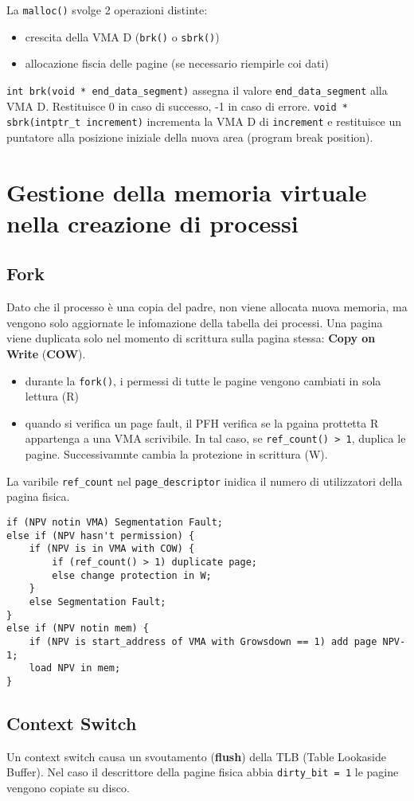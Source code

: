\documentclass[12pt, a4paper]{report}
\begin{document}
La \texttt{malloc()} svolge 2 operazioni distinte:
\begin{itemize}
	\item crescita della VMA D (\texttt{brk()} o \texttt{sbrk()})
	\item allocazione fiscia delle pagine (se necessario riempirle coi dati)
\end{itemize}
\texttt{int brk(void * end\_data\_segment)} assegna il valore
\texttt{end\_data\_segment} alla VMA D. Restituisce 0 in caso di successo, -1 in
caso di errore.
\texttt{void * sbrk(intptr\_t increment)} incrementa la VMA D di
\texttt{increment} e restituisce un puntatore alla posizione iniziale della
nuova area (program break position).

\section{Gestione della memoria virtuale nella creazione di processi}
\subsection{Fork}
Dato che il processo è una copia del padre, non viene allocata nuova memoria,
ma vengono solo aggiornate le infomazione della tabella dei processi. Una pagina
viene duplicata solo nel momento di scrittura sulla pagina stessa: \textbf{Copy
on Write} (\textbf{COW}).
\begin{itemize}
	\item durante la \texttt{fork()}, i permessi di tutte le pagine vengono
		cambiati in sola lettura (R)
	\item quando si verifica un page fault, il PFH verifica se la pgaina
		prottetta R appartenga a una VMA scrivibile. In tal caso, se
		\texttt{ref\_count() > 1}, duplica le pagine. Successivamnte cambia la
		protezione in scrittura (W).
\end{itemize}
La varibile \texttt{ref\_count} nel \texttt{page\_descriptor} inidica il numero di
utilizzatori della pagina fisica.
\begin{verbatim}
if (NPV notin VMA) Segmentation Fault;
else if (NPV hasn't permission) {
    if (NPV is in VMA with COW) {
        if (ref_count() > 1) duplicate page;
        else change protection in W;
    }
    else Segmentation Fault;
}
else if (NPV notin mem) {
    if (NPV is start_address of VMA with Growsdown == 1) add page NPV-1;
    load NPV in mem;
}
\end{verbatim}
\subsection{Context Switch}
Un context switch causa un svoutamento (\textbf{flush}) della TLB (Table
Lookaside Buffer). Nel caso il descrittore della pagine fisica abbia
\texttt{dirty\_bit = 1} le pagine vengono copiate su disco.
\end{document}
